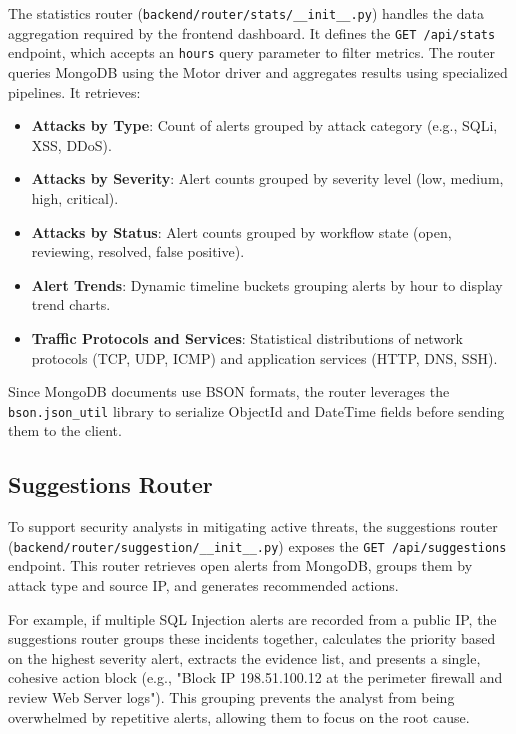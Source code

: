 \documentclass[12pt,a4paper]{report}
\begin{document}
The statistics router (\texttt{backend/router/stats/\_\_init\_\_.py}) handles the data aggregation required by the frontend dashboard. It defines the \texttt{GET /api/stats} endpoint, which accepts an \texttt{hours} query parameter to filter metrics. The router queries MongoDB using the Motor driver and aggregates results using specialized pipelines. It retrieves:
\begin{itemize}[leftmargin=1.5em]
  \item \textbf{Attacks by Type}: Count of alerts grouped by attack category (e.g., SQLi, XSS, DDoS).
  \item \textbf{Attacks by Severity}: Alert counts grouped by severity level (low, medium, high, critical).
  \item \textbf{Attacks by Status}: Alert counts grouped by workflow state (open, reviewing, resolved, false positive).
  \item \textbf{Alert Trends}: Dynamic timeline buckets grouping alerts by hour to display trend charts.
  \item \textbf{Traffic Protocols and Services}: Statistical distributions of network protocols (TCP, UDP, ICMP) and application services (HTTP, DNS, SSH).
\end{itemize}

Since MongoDB documents use BSON formats, the router leverages the \texttt{bson.json\_util} library to serialize ObjectId and DateTime fields before sending them to the client.

\subsection{Suggestions Router}

To support security analysts in mitigating active threats, the suggestions router (\texttt{backend/router/suggestion/\_\_init\_\_.py}) exposes the \texttt{GET /api/suggestions} endpoint. This router retrieves open alerts from MongoDB, groups them by attack type and source IP, and generates recommended actions.

For example, if multiple SQL Injection alerts are recorded from a public IP, the suggestions router groups these incidents together, calculates the priority based on the highest severity alert, extracts the evidence list, and presents a single, cohesive action block (e.g., "Block IP 198.51.100.12 at the perimeter firewall and review Web Server logs"). This grouping prevents the analyst from being overwhelmed by repetitive alerts, allowing them to focus on the root cause.
\end{document}
